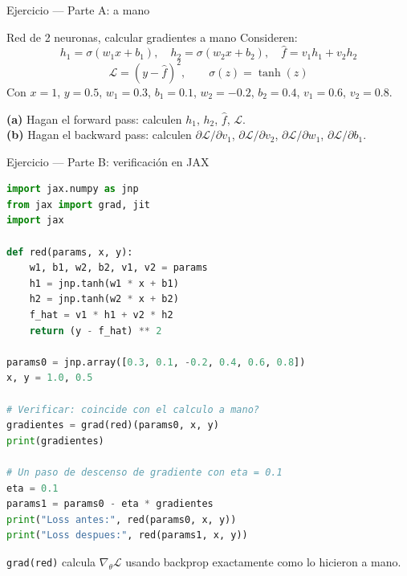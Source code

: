 \documentclass[aspectratio=169,12pt]{beamer}
\begin{document}
\begin{frame}[fragile]{Ejercicio — Parte A: a mano}
\begin{taskbox}{Red de 2 neuronas, calcular gradientes a mano}
Consideren:
\[
  h_1 = \sigma(w_1 x + b_1),\quad h_2 = \sigma(w_2 x + b_2),\quad \hat{f} = v_1 h_1 + v_2 h_2
\]
\[
  \mathcal{L} = (y - \hat{f})^2, \qquad \sigma(z) = \tanh(z)
\]
Con $x=1$, $y=0.5$, $w_1=0.3$, $b_1=0.1$, $w_2=-0.2$, $b_2=0.4$, $v_1=0.6$, $v_2=0.8$.

\vspace{4pt}
\textbf{(a)} Hagan el forward pass: calculen $h_1$, $h_2$, $\hat{f}$, $\mathcal{L}$.\\[3pt]
\textbf{(b)} Hagan el backward pass: calculen $\partial\mathcal{L}/\partial v_1$, $\partial\mathcal{L}/\partial v_2$, $\partial\mathcal{L}/\partial w_1$, $\partial\mathcal{L}/\partial b_1$.\\[3pt]
\end{taskbox}
\end{frame}

\begin{frame}[fragile]{Ejercicio — Parte B: verificación en JAX}

\begin{lstlisting}[language=Python]
import jax.numpy as jnp
from jax import grad, jit
import jax

def red(params, x, y):
    w1, b1, w2, b2, v1, v2 = params
    h1 = jnp.tanh(w1 * x + b1)
    h2 = jnp.tanh(w2 * x + b2)
    f_hat = v1 * h1 + v2 * h2
    return (y - f_hat) ** 2

params0 = jnp.array([0.3, 0.1, -0.2, 0.4, 0.6, 0.8])
x, y = 1.0, 0.5

# Verificar: coincide con el calculo a mano?
gradientes = grad(red)(params0, x, y)
print(gradientes)

# Un paso de descenso de gradiente con eta = 0.1
eta = 0.1
params1 = params0 - eta * gradientes
print("Loss antes:", red(params0, x, y))
print("Loss despues:", red(params1, x, y))
\end{lstlisting}

\vspace{2pt}
\textcolor{accentteal}{\small \texttt{grad(red)} calcula $\nabla_{\theta}\mathcal{L}$ usando backprop exactamente como lo hicieron a mano.}
\end{frame}
\end{document}
